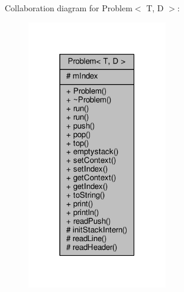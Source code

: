 Collaboration diagram for Problem$<$ T, D $>$\+:
\nopagebreak
\begin{figure}[H]
\begin{center}
\leavevmode
\includegraphics[width=174pt]{class_problem__coll__graph}
\end{center}
\end{figure}
